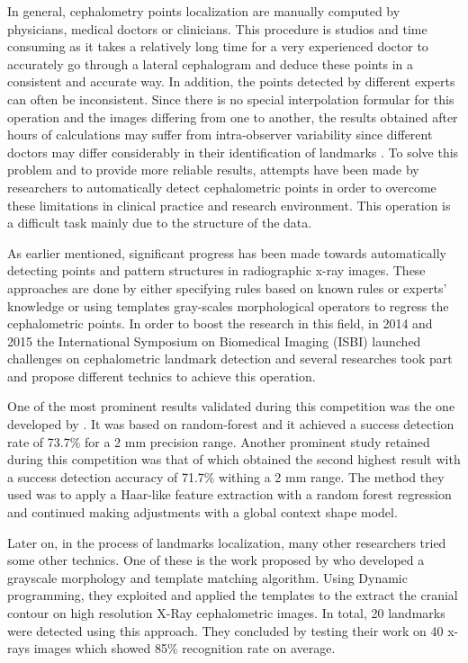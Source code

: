 \documentclass{elektr}
\begin{document}
\tab In general, cephalometry points localization are manually computed by physicians, medical doctors or clinicians. This procedure is studios and time consuming as it takes a relatively long time for a very experienced doctor to accurately go through a lateral cephalogram and deduce these points in a consistent and accurate way. In addition, the points detected by different experts can often be inconsistent. Since there is no special interpolation formular for this operation and the images differing from one to another, the results obtained after hours of calculations may suffer from intra-observer variability since different doctors may differ considerably in their identification of landmarks \cite{ref2}. To solve this problem and to provide more reliable results, attempts have been made by researchers to automatically detect cephalometric points in order to overcome these limitations in clinical practice and research environment. This operation is a difficult task mainly due to the structure of the data. 

As earlier mentioned, significant progress has been made towards automatically detecting points and pattern structures in radiographic x-ray images. These approaches are done by either specifying rules based on known rules or experts’ knowledge or using templates gray-scales morphological operators to regress the cephalometric points. In order to boost the research in this field, in 2014 and 2015 the International Symposium on Biomedical Imaging (ISBI) launched challenges on cephalometric landmark detection and several researches took part and propose different technics to achieve this operation. 

One of the most prominent results validated during this competition was the one developed by \cite{ref3}. It was based on random-forest and it achieved a success detection rate of 73.7$\%$  for a 2 mm precision range. Another prominent study retained during this competition was that of \cite{ref4} which obtained the second highest result with a success detection accuracy of 71.7$\%$  withing a 2 mm range. The method they used was to apply a Haar-like feature extraction with a random forest regression and continued making adjustments with a global context shape model.

Later on, in the process of landmarks localization, many other researchers tried some other technics. One of these is the work proposed by \cite{ref5} who developed a grayscale morphology and template matching algorithm. Using Dynamic programming, they exploited and applied the templates to the extract the cranial contour on high resolution X-Ray cephalometric images. In total, 20 landmarks were detected using this approach. They concluded by testing their work on 40 x-rays images which showed 85$\%$  recognition rate on average. 
\end{document}
